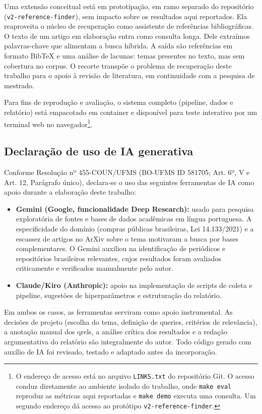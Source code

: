 \documentclass[12pt]{article}
\begin{document}
Uma extensão conceitual está em prototipação, em ramo separado do repositório (\texttt{v2-reference-finder}), sem impacto sobre os resultados aqui reportados. Ela reaproveita o núcleo de recuperação como assistente de referências bibliográficas. O texto de um artigo em elaboração entra como consulta longa. Dele extraímos palavras-chave que alimentam a busca híbrida. A saída são referências em formato BibTeX e uma análise de lacunas: temas presentes no texto, mas sem cobertura no corpus. O recorte transpõe o problema de recuperação deste trabalho para o apoio à revisão de literatura, em continuidade com a pesquisa de mestrado.

Para fins de reprodução e avaliação, o sistema completo (pipeline, dados e relatório) está empacotado em container e disponível para teste interativo por um terminal web no navegador\footnote{O endereço de acesso está no arquivo \texttt{LINKS.txt} do repositório Git. O acesso conduz diretamente ao ambiente isolado do trabalho, onde \texttt{make eval} reproduz as métricas aqui reportadas e \texttt{make demo} executa uma consulta. Um segundo endereço dá acesso ao protótipo \texttt{v2-reference-finder}.}.

\subsection*{Declaração de uso de IA generativa}

Conforme Resolução nº 455-COUN/UFMS (BO-UFMS ID 581705; Art. 6º, V e Art. 12, Parágrafo único), declara-se o uso das seguintes ferramentas de IA como apoio durante a elaboração deste trabalho:

\begin{itemize}
    \item \textbf{Gemini (Google, funcionalidade Deep Research):} usado para pesquisa exploratória de fontes e bases de dados acadêmicas em língua portuguesa. A especificidade do domínio (compras públicas brasileiras, Lei 14.133/2021) e a escassez de artigos no ArXiv sobre o tema motivaram a busca por bases complementares. O Gemini auxiliou na identificação de periódicos e repositórios brasileiros relevantes, cujos resultados foram avaliados criticamente e verificados manualmente pelo autor.
    \item \textbf{Claude/Kiro (Anthropic):} apoio na implementação de scripts de coleta e pipeline, sugestões de hiperparâmetros e estruturação do relatório.
\end{itemize}

Em ambos os casos, as ferramentas serviram como apoio instrumental. As decisões de projeto (escolha do tema, definição de queries, critérios de relevância), a anotação manual dos qrels, a análise crítica dos resultados e a redação argumentativa do relatório são integralmente do autor. Todo código gerado com auxílio de IA foi revisado, testado e adaptado antes da incorporação.



\end{document}
